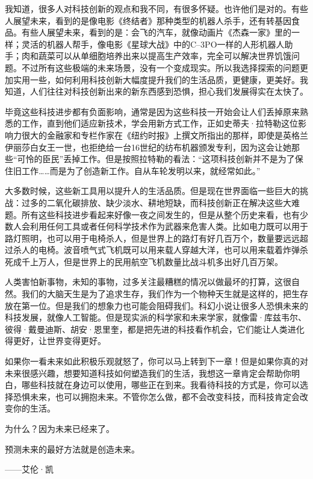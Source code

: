 我知道，很多人对科技创新的观点和我不同，有很多怀疑。也许他们是对的。有些人展望未来，看到的是像电影《终结者》那种类型的机器人杀手，还有转基因食品。有些人展望未来，看到的是：会飞的汽车，就像动画片《杰森一家》里的一样；灵活的机器人帮手，像电影《星球大战》中的C–3PO一样的人形机器人助手；肉和蔬菜可以从单细胞培养出来以提高生产效率，完全可以解决世界饥饿问题。不过所有这些极端的未来场景，没有一个变成现实。所以我选择探索的问题更加实用一些，如何利用科技创新大幅度提升我们的生活品质，更健康，更美好。我知道，人们往往对科技创新出来的新东西感到恐惧，担心我们发展得实在太快了。

毕竟这些科技进步都有负面影响，通常是因为这些科技一开始会让人们丢掉原来熟悉的工作，直到他们适应新技术，学会用新方式工作，正如史蒂夫·拉特勒这位影响力很大的金融家和专栏作家在《纽约时报》上撰文所指出的那样，即使是英格兰伊丽莎白女王一世，也拒绝给一台16世纪的纺布机器颁发专利，因为这会让她那些“可怜的臣民”丢掉工作。但是按照拉特勒的看法：“这项科技创新并不是为了保住旧工作……而是为了创造新工作。自从车轮发明以来，就经常如此。”

大多数时候，这些新工具用以提升人的生活品质。但是现在世界面临一些巨大的挑战：过多的二氧化碳排放、缺少淡水、耕地短缺，而科技创新正在解决这些大难题。所有这些科技进步看起来好像一夜之间发生的，但是从整个历史来看，也有少数人会利用任何工具或者任何科学技术作为武器来危害人类。比如电力既可以用于路灯照明，也可以用于电椅杀人，但是世界上的路灯有好几百万个，数量要远远超过杀人的电椅。波音喷气式飞机既可以用来载人穿越大洋，也可以用来载着炸弹杀死成千上万人，但是世界上的民用航空飞机数量比战斗机多出好几百万架。

人类害怕新事物，未知的事物，过多关注最糟糕的情况以做最坏的打算，这很自然。我们的大脑天生是为了追求生存，我们作为一个物种天生就是这样的，把生存放在第一位。但是我们的想象力也可能会阻碍我们。科幻小说让很多人恐惧未来的科技发展，就像人工智能。但是现实派的科学家和未来学家，就像雷·库兹韦尔、彼得·戴曼迪斯、胡安·恩里奎，都是把先进的科技看作机会，它们能让人类进化得更好，让世界变得更好。

如果你一看未来如此积极乐观就怒了，你可以马上转到下一章！但是如果你真的对未来很感兴趣，想要知道科技如何塑造我们的生活，我想这一章肯定会帮助你明白，哪些科技就在身边可以使用，哪些正在到来。我看待科技的方式是，你可以选择恐惧未来，也可以拥抱未来。不管你怎么做，都不会改变科技，而科技肯定会改变你的生活。

为什么？因为未来已经来了。

\begin{BookQuote}
预测未来的最好方法就是创造未来。

\hfill ——艾伦·凯
\end{BookQuote}

